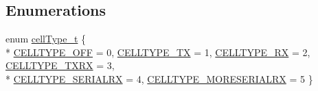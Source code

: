 \subsection*{Enumerations}
\begin{DoxyCompactItemize}
\item 
enum \hyperlink{group___schedule_gad8490d4fdf8cef27f7e5fa6a37046a3d}{cell\+Type\+\_\+t} \{ \\*
\hyperlink{group___schedule_ggad8490d4fdf8cef27f7e5fa6a37046a3da1de02f946786ffb3f640a91a9f6a8821}{C\+E\+L\+L\+T\+Y\+P\+E\+\_\+\+O\+FF} = 0, 
\hyperlink{group___schedule_ggad8490d4fdf8cef27f7e5fa6a37046a3dac33ca5a04740302ac863ad086444176c}{C\+E\+L\+L\+T\+Y\+P\+E\+\_\+\+TX} = 1, 
\hyperlink{group___schedule_ggad8490d4fdf8cef27f7e5fa6a37046a3da4bb32ecfb99b1a48cf7b555de0384f8c}{C\+E\+L\+L\+T\+Y\+P\+E\+\_\+\+RX} = 2, 
\hyperlink{group___schedule_ggad8490d4fdf8cef27f7e5fa6a37046a3da703f29e4d2b16980f09eceaeb7a35281}{C\+E\+L\+L\+T\+Y\+P\+E\+\_\+\+T\+X\+RX} = 3, 
\\*
\hyperlink{group___schedule_ggad8490d4fdf8cef27f7e5fa6a37046a3da605bbb03557716b1d5b350c8756a6cdb}{C\+E\+L\+L\+T\+Y\+P\+E\+\_\+\+S\+E\+R\+I\+A\+L\+RX} = 4, 
\hyperlink{group___schedule_ggad8490d4fdf8cef27f7e5fa6a37046a3da6f952ab410339bde815d94b59e274a81}{C\+E\+L\+L\+T\+Y\+P\+E\+\_\+\+M\+O\+R\+E\+S\+E\+R\+I\+A\+L\+RX} = 5
 \}
\end{DoxyCompactItemize}
